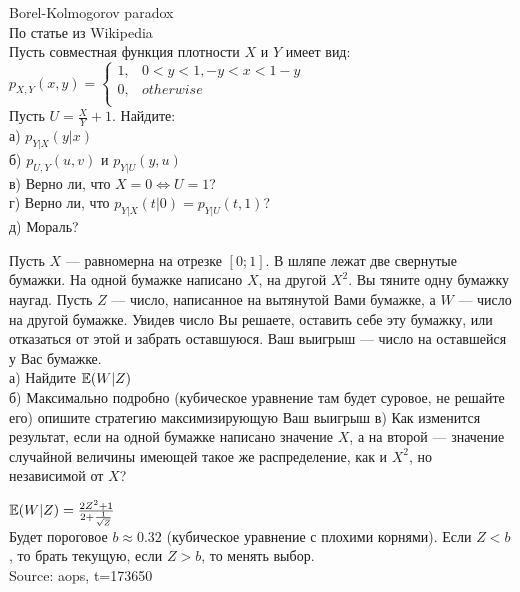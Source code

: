 \begin{solution}
\begin{solution}
\begin{solution}
\begin{solution}
\begin{solution}
\begin{solution}
\begin{solution}
\begin{problem}
 Borel-Kolmogorov paradox \\
По статье из Wikipedia \\
Пусть совместная функция плотности $X$ и $Y$ имеет вид: \\
$p_{X,Y}(x,y)=
\begin{cases}
  1, & 0<y<1, -y<x<1-y \\
  0, & otherwise \\
\end{cases}$ \\
Пусть $U=\frac{X}{Y}+1$. Найдите: \\
а) $p_{Y|X}(y|x)$ \\
б) $p_{U,Y}(u,v)$ и $p_{Y|U}(y,u)$ \\
в) Верно ли, что $X=0 \Leftrightarrow U=1$? \\
г) Верно ли, что $p_{Y|X}(t|0)=p_{Y|U}(t,1)$? \\
д) Мораль? 
\end{problem} 
\begin{solution} 

\end{solution}

\begin{problem}
Пусть $X$ --- равномерна на отрезке $[0;1]$. В шляпе лежат две свернутые бумажки. На одной бумажке написано $X$, на другой $X^{2}$. Вы тяните одну бумажку наугад. Пусть $Z$ --- число, написанное на вытянутой Вами бумажке, а $W$ --- число на другой бумажке. Увидев число Вы решаете, оставить себе эту бумажку, или отказаться от этой и забрать оставшуюся. Ваш выигрыш --- число на оставшейся у Вас бумажке. \\
а) Найдите $\mathbb{E}(W|Z)$ \\
б) Максимально подробно (кубическое уравнение там будет суровое, не решайте его) опишите стратегию максимизирующую Ваш выигрыш 
в) Как изменится результат, если на одной бумажке написано значение $ X $, а на второй --- значение случайной величины имеющей такое же распределение, как и $ X^{2} $, но независимой от $ X $?


\end{problem} 
\begin{solution} 

$\mathbb{E}(W|Z)=\frac{2Z^{2}+1}{2+\frac{1}{\sqrt{Z}}}$ \\
Будет пороговое $b\approx 0.32$ (кубическое уравнение с плохими корнями). Если $Z<b$, то брать текущую, если $Z>b$, то менять выбор. \\
Source: aops, t=173650 
\end{solution}


\end{solution}
\end{solution}
\end{solution}
\end{solution}
\end{solution}
\end{solution}
\end{solution}
